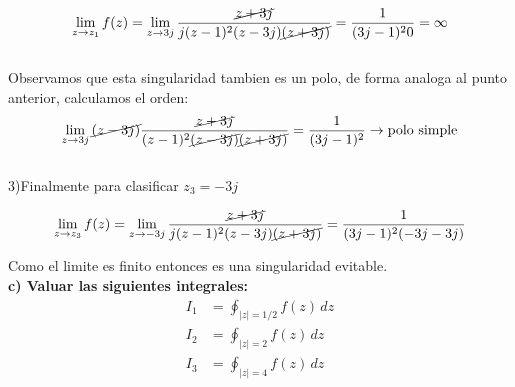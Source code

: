 \documentclass[12pt]{report}
\begin{document}
$$\lim_{z \to z_1}f(z)=\lim_{z \to 3j}\frac{\cancel{z+3j}}{j(z - 1)^2(z-3j)\cancel{(z+3j)}}=\frac{1}{(3j-1)^20}=\infty$$\\
Observamos que esta singularidad tambien es un polo, de forma analoga al punto anterior, calculamos el orden:
$$\lim_{z \to 3j}\cancel{(z - 3j)}\frac{\cancel{z+3j}}{(z - 1)^2\cancel{(z-3j)}\cancel{(z+3j)}}
=\frac{1}{(3j-1)^2}\rightarrow \text{polo simple}$$\\

3)Finalmente para clasificar $z_3=-3j$

$$\lim_{z \to z_3}f(z)=\lim_{z \to -3j}\frac{\cancel{z+3j}}{j(z - 1)^2(z-3j)\cancel{(z+3j)}}=\frac{1}{(3j-1)^2(-3j-3j)}$$

Como el limite es finito entonces es una singularidad evitable.\\

\textbf{c) Valuar las siguientes integrales:}\\[6pt]
\begin{align*}
I_1 &= \oint_{|z|=1/2} f(z) \, dz \\[6pt]
I_2 &= \oint_{|z|=2} f(z) \, dz \\[6pt]
I_3 &= \oint_{|z|=4} f(z) \, dz\\[6pt]
\end{align*}
\end{document}
